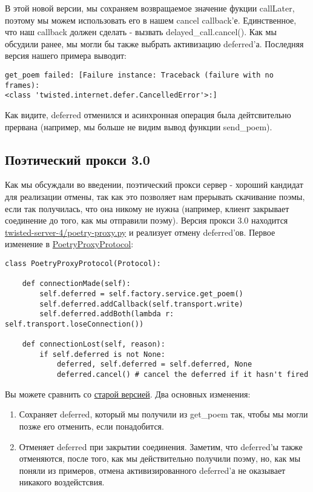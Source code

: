 В этой новой версии, мы сохраняем возвращаемое значение 
фукции callLater, поэтому мы можем использовать его в 
нашем cancel callback'е. Единственное, что наш callback 
должен сделать - вызвать delayed\_call.cancel(). Как мы обсудили 
ранее, мы могли бы также выбрать активизацию deferred'а. 
Последняя версия нашего примера выводит:

 \begin{verbatim}
get_poem failed: [Failure instance: Traceback (failure with no frames): 
<class 'twisted.internet.defer.CancelledError'>:]
\end{verbatim} 


Как видите, deferred отменился и асинхронная 
операция была дейтсвительно прервана (например, мы больше 
не видим вывод функции send\_poem).

 
\subsection{Поэтический прокси 3.0}

Как мы обсуждали во введении, поэтический прокси сервер - 
хороший кандидат для реализации отмены, так как это 
позволяет нам прерывать скачивание поэмы, если так получилась, 
что она никому не нужна (например, клиент закрывает соединение 
до того, как мы отправили поэму). Версия прокси 3.0 находится 
\href{http://github.com/jdavisp3/twisted-intro/blob/master/twisted-server-4/poetry-proxy.py#L1}{twisted-server-4/poetry-proxy.py} и реализует отмену deferred'ов. Первое изменение в 
\href{http://github.com/jdavisp3/twisted-intro/blob/master/twisted-server-4/poetry-proxy.py#L52}{PoetryProxyProtocol}:

 \begin{verbatim}
class PoetryProxyProtocol(Protocol):

    def connectionMade(self):
        self.deferred = self.factory.service.get_poem()
        self.deferred.addCallback(self.transport.write)
        self.deferred.addBoth(lambda r: self.transport.loseConnection())

    def connectionLost(self, reason):
        if self.deferred is not None:
            deferred, self.deferred = self.deferred, None
            deferred.cancel() # cancel the deferred if it hasn't fired
\end{verbatim}  

Вы можете сравнить со 
\href{http://github.com/jdavisp3/twisted-intro/blob/master/twisted-server-2/poetry-proxy.py#L52}{старой версией}. Два основных изменения:
\begin{enumerate}
\item Сохраняет deferred, который мы получили из get\_poem так, чтобы 
    мы могли позже его отменить, если понадобится.

\item Отменяет deferred при закрытии соединения. Заметим, что 
    deferred'ы также отменяются, после того, как мы действительно получили 
    поэму, но, как мы поняли из примеров, отмена активизированного deferred'а 
    не оказывает никакого воздейстсвия.
\end{enumerate}


